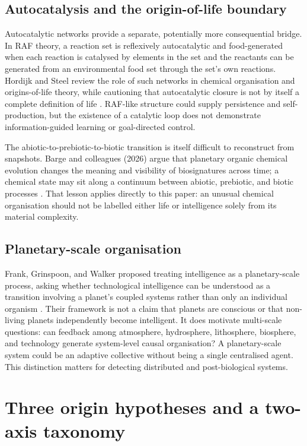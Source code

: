 \documentclass[11pt]{article}
\begin{document}
\subsection{Autocatalysis and the origin-of-life boundary}

Autocatalytic networks provide a separate, potentially more consequential bridge. In RAF theory, a reaction set is reflexively autocatalytic and food-generated when each reaction is catalysed by elements in the set and the reactants can be generated from an environmental food set through the set's own reactions. Hordijk and Steel review the role of such networks in chemical organisation and origins-of-life theory, while cautioning that autocatalytic closure is not by itself a complete definition of life \citep{HordijkSteel2018}. RAF-like structure could supply persistence and self-production, but the existence of a catalytic loop does not demonstrate information-guided learning or goal-directed control.

The abiotic-to-prebiotic-to-biotic transition is itself difficult to reconstruct from snapshots. Barge and colleagues (2026) argue that planetary organic chemical evolution changes the meaning and visibility of biosignatures across time; a chemical state may sit along a continuum between abiotic, prebiotic, and biotic processes \citep{Barge2026}. That lesson applies directly to this paper: an unusual chemical organisation should not be labelled either life or intelligence solely from its material complexity.

\subsection{Planetary-scale organisation}

Frank, Grinspoon, and Walker proposed treating intelligence as a planetary-scale process, asking whether technological intelligence can be understood as a transition involving a planet's coupled systems rather than only an individual organism \citep{Frank2022}. Their framework is not a claim that planets are conscious or that non-living planets independently become intelligent. It does motivate multi-scale questions: can feedback among atmosphere, hydrosphere, lithosphere, biosphere, and technology generate system-level causal organisation? A planetary-scale system could be an adaptive collective without being a single centralised agent. This distinction matters for detecting distributed and post-biological systems.

\section{Three origin hypotheses and a two-axis taxonomy}
\end{document}
